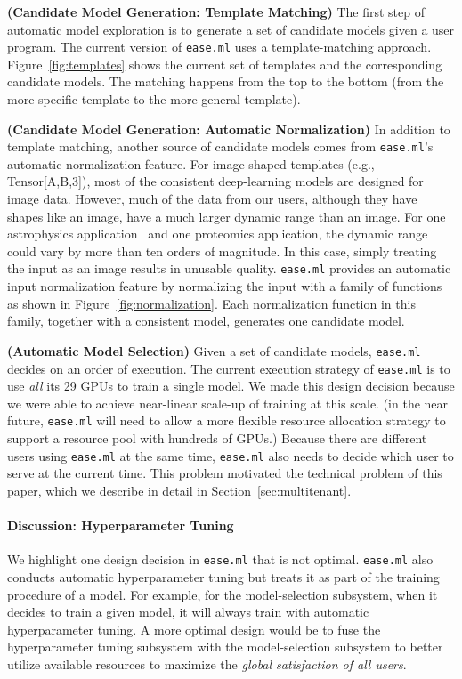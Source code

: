 \documentclass[letterpaper]{vldb}
\newcommand{\eml}{\texttt{ease.ml}\xspace}
\begin{document}
\vspace{0.5em}
\noindent
{\bf (Candidate Model Generation: Template Matching)} 
The first step of automatic
model exploration is to generate a set of 
candidate models given a user program. The current
version of \eml uses a template-matching approach.
Figure~\ref{fig:templates} shows the current set of
templates and the corresponding candidate models. 
The matching happens from the top to the bottom 
(from the more specific template to the more general template).

\vspace{0.5em}
\noindent
{\bf (Candidate Model Generation: Automatic Normalization)} 
In addition to template matching, another source of candidate models 
comes from \eml's automatic normalization feature.
For image-shaped templates (e.g., Tensor[A,B,3]),
most of the consistent deep-learning models are designed for
image data. However, much of the data from our users, although
they have shapes like an image, have a much larger dynamic
range than an image. For one astrophysics application~\cite{Schawinski2017}
and one proteomics application, the dynamic range could
vary by more than ten orders of magnitude. In this case,
simply treating the input as an image results in unusable 
quality. \eml provides an automatic input
normalization feature by normalizing the input
with a family of functions as shown in Figure~\ref{fig:normalization}.
Each normalization function in this family, together with 
a consistent model, generates one  
candidate model.

\vspace{0.5em}
\noindent
{\bf (Automatic Model Selection)} 
Given a set of candidate models, \eml decides on an order of
execution. The current execution strategy of \eml is to 
use {\em all} its 29 GPUs to train a single 
model. We made this design decision 
because we were able to achieve near-linear scale-up
of training at this scale. (in the near 
future, \eml will need to allow a more flexible resource 
allocation strategy to support a resource pool 
with hundreds of GPUs.) Because there are different
users using \eml at the same time, \eml also needs
to decide which user to serve at the current time.
This problem motivated the technical problem of this paper,
which we describe in detail in Section~\ref{sec:multitenant}.

\vspace{-1em}
\paragraph*{Discussion: Hyperparameter Tuning}
We highlight one design decision in \eml
that is not optimal. \eml also conducts automatic
hyperparameter tuning but treats it as part of the
training procedure of a model. For example, for the model-selection
subsystem, when it decides to train a given model,
it will always train with
automatic hyperparameter tuning. A more optimal design 
would be to fuse the hyperparameter tuning subsystem
with the model-selection subsystem to better
utilize available resources to maximize the
{\em global satisfaction of all users}.
\end{document}
